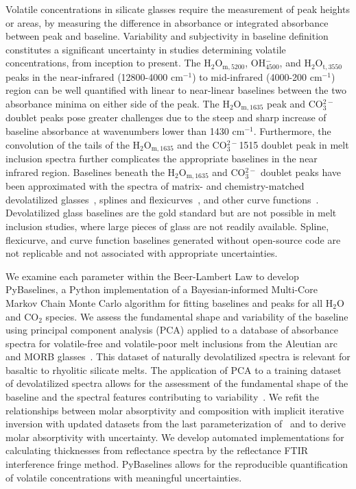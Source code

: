 \documentclass[draft]{agujournal2019}
\begin{document}
Volatile concentrations in silicate glasses require the measurement of peak heights or areas, by measuring the difference in absorbance or integrated absorbance between peak and baseline. Variability and subjectivity in baseline definition constitutes a significant uncertainty in studies determining volatile concentrations, from inception to present. The H$_{2}$O$_{\mathrm{m}, 5200}$, OH$^{-}_{4500}$, and \textepsilon${\mathrm{H_2O_{t, 3550}}}$ peaks in the near-infrared (12800-4000 cm$^{-1}$) to mid-infrared (4000-200 cm$^{-1}$) region can be well quantified with linear to near-linear baselines between the two absorbance minima on either side of the peak. The H$_{2}$O$_{\mathrm{m}, 1635}$ peak and CO$_{3}^{2-}$ doublet peaks pose greater challenges due to the steep and sharp increase of baseline absorbance at wavenumbers lower than 1430 cm$^{-1}$. Furthermore, the convolution of the tails of the H$_{2}$O$_{\mathrm{m}, 1635}$ and the CO$_{3}^{2-}$1515 doublet peak in melt inclusion spectra further complicates the appropriate baselines in the near infrared region. Baselines beneath the H$_{2}$O$_{\mathrm{m}, 1635}$ and CO$_{3}^{2-}$ doublet peaks have been approximated with the spectra of matrix- and chemistry-matched devolatilized glasses~\cite{Dixonetal1988, Newmanetal2000}, splines and flexicurves~\cite{DixonandStolper1995}, and other curve functions~\cite{DixonandClague2001}. Devolatilized glass baselines are the gold standard but are not possible in melt inclusion studies, where large pieces of glass are not readily available. Spline, flexicurve, and curve function baselines generated without open-source code are not replicable and not associated with appropriate uncertainties. 

We examine each parameter within the Beer-Lambert Law to develop PyBaselines, a Python implementation of a Bayesian-informed Multi-Core Markov Chain Monte Carlo algorithm for fitting baselines and peaks for all H$_2$O and CO$_2$ species. We assess the fundamental shape and variability of the baseline using principal component analysis (PCA) applied to a database of absorbance spectra for volatile-free and volatile-poor melt inclusions from the Aleutian arc~\cite{RasmussenThesis} and MORB glasses~\cite{Newmanetal2000}. This dataset of naturally devolatilized spectra is relevant for basaltic to rhyolitic silicate melts. The application of PCA to a training dataset of devolatilized spectra allows for the assessment of the fundamental shape of the baseline and the spectral features contributing to variability~\cite{Carvajaletal2016}. We refit the relationships between molar absorptivity and composition with implicit iterative inversion with updated datasets from the last parameterization of~ and to derive molar absorptivity with uncertainty. We develop automated implementations for calculating thicknesses from reflectance spectra by the reflectance FTIR interference fringe method. PyBaselines allows for the reproducible quantification of volatile concentrations with meaningful uncertainties.
\end{document}
